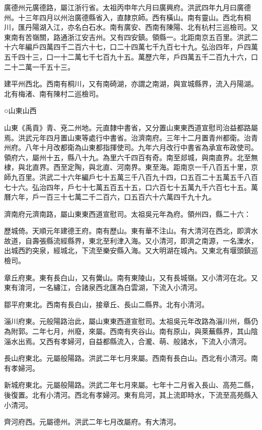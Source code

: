廣德州元廣德路，屬江浙行省。太祖丙申年六月曰廣興府。洪武四年九月曰廣德州。十三年四月以州治廣德縣省入，直隸京師。西有橫山。南有靈山。西北有桐川，匯丹陽湖入江，亦名白石水。南有廣安、西南有陳陽、北有杭村三巡檢司。又東南有苦嶺關，路通浙江安吉州。又有四安鎮。領縣一。北距南京五百里。洪武二十六年編戶四萬四千二百六十七，口二十四萬七千九百七十九。弘治四年，戶四萬五千四十三，口一十二萬七千七百九十五。萬歷六年，戶四萬五千二百九十六，口二十二萬一千五十三。

建平州西北。西南有桐川，又有南碕湖，亦謂之南湖，與宣城縣界，流入丹陽湖。北有梅渚、南有陳村二巡檢司。

○山東山西

山東《禹貢》青、兗二州地。元直隸中書省，又分置山東東西道宣慰司治益都路屬焉。洪武元年四月置山東等處行中書省。治濟南府。三年十二月置青州都衛。治青州府。八年十月改都衛為山東都指揮使司。九年六月改行中書省為承宣布政使司。領府六，屬州十五，縣八十九。為里六千四百有奇。南至郯城，與南直界。北至無棣，與北直界。西至定陶，與北直、河南界。東至海。距南京一千八百五十里，京師九百里。洪武二十六年編戶七十五萬三千八百九十四，口五百二十五萬五千八百七十六。弘治四年，戶七十七萬五百五十五，口六百七十五萬九千六百七十五。萬曆六年，戶一百三十七萬二千二百六，口五百六十六萬四千九十九。

濟南府元濟南路，屬山東東西道宣慰司。太祖吳元年為府。領州四，縣二十六：

歷城倚。天順元年建德王府。南有歷山。東有華不注山。有大清河在西北，即濟水故道，自壽張縣流經縣界，東北至利津入海。又小清河，即濟之南源，一名濼水，出城西趵突泉，經城北，下流至樂安縣入海。又大明湖在城內。又東北有堰頭鎮巡檢司。

章丘府東。東有長白山，又有黌山。南有東陵山，又有長城嶺。又小清河在北。又東有淯河，一名繡江，合諸泉西北匯為白雲湖，下流入小清河。

鄒平府東北。西南有長白山，接章丘、長山二縣界。北有小清河。

淄川府東。元般陽路治此，屬山東東西道宣慰司。太祖吳元年改路為淄川州，縣仍為附郭。二年七月，州廢，來屬。西南有夾谷山。南有原山，與萊蕪縣界，其山陰淄水出焉。又西有孝婦河，自益都縣流入，合瀧、萌、般諸水，下流入小清河。

長山府東北。元屬般陽路。洪武二年七月來屬。西南有長白山。西北有小清河。南有孝婦河。

新城府東北。元屬般陽路。洪武二年七月來屬。七年十二月省入長山、高苑二縣，後復置。北有小清河。西北有孝婦河。東有烏河，其上流即時水，下流至高苑縣入小清河。

齊河府西。元屬德州。洪武二年七月改屬府。有大清河。

